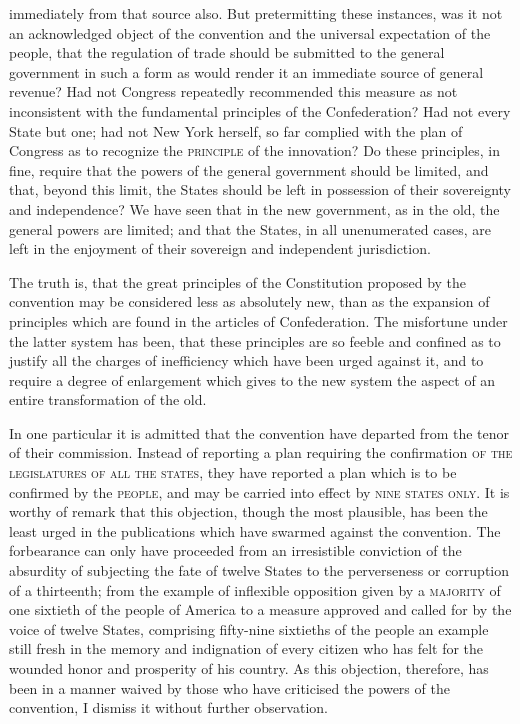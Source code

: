 immediately from that source also. But pretermitting these instances, was it not an acknowledged object of the convention and the universal expectation of the people, that the regulation of trade should be submitted to the general government in such a form as would render it an immediate source of general revenue? Had not Congress repeatedly recommended this measure as not inconsistent with the fundamental principles of the Confederation? Had not every State but one; had not New York herself, so far complied with the plan of Congress as to recognize the \textsc{principle }of the innovation? Do these principles, in fine, require that the powers of the general government should be limited, and that, beyond this limit, the States should be left in possession of their sovereignty and independence? We have seen that in the new government, as in the old, the general powers are limited; and that the States, in all unenumerated cases, are left in the enjoyment of their sovereign and independent jurisdiction.

The truth is, that the great principles of the Constitution proposed by the convention may be considered less as absolutely new, than as the expansion of principles which are found in the articles of Confederation. The misfortune under the latter system has been, that these principles are so feeble and confined as to justify all the charges of inefficiency which have been urged against it, and to require a degree of enlargement which gives to the new system the aspect of an entire transformation of the old.

In one particular it is admitted that the convention have departed from the tenor of their commission. Instead of reporting a plan requiring the confirmation \textsc{of the legislatures of all the states}, they have reported a plan which is to be confirmed by the \textsc{people}, and may be carried into effect by \textsc{nine states only}. It is worthy of remark that this objection, though the most plausible, has been the least urged in the publications which have swarmed against the convention. The forbearance can only have proceeded from an irresistible conviction of the absurdity of subjecting the fate of twelve States to the perverseness or corruption of a thirteenth; from the example of inflexible opposition given by a \textsc{majority }of one sixtieth of the people of America to a measure approved and called for by the voice of twelve States, comprising fifty-nine sixtieths of the people an example still fresh in the memory and indignation of every citizen who has felt for the wounded honor and prosperity of his country. As this objection, therefore, has been in a manner waived by those who have criticised the powers of the convention, I dismiss it without further observation.

